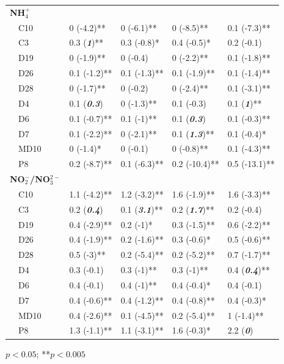 \documentclass[journal = esthag, manuscript = article]{achemso}\usepackage[]{graphicx}\usepackage[]{color}
\begin{document}
\begin{table}[!tbp]
\begin{center}
\begin{tabular}{lllll}
\hline
{\bfseries NH$_{4}^{+}$}&&&&\tabularnewline
~~C10&0 \footnotesize{(-4.2)**}&0 \footnotesize{(-6.1)**}&0 \footnotesize{(-8.5)**}&0.1 \footnotesize{(-7.3)**}\tabularnewline
~~C3&0.3 \footnotesize{(\textit{\textbf{1}})**}&0.3 \footnotesize{(-0.8)*}&0.4 \footnotesize{(-0.5)*}&0.2 \footnotesize{(-0.1)}\tabularnewline
~~D19&0 \footnotesize{(-1.9)**}&0 \footnotesize{(-0.4)}&0 \footnotesize{(-2.2)**}&0.1 \footnotesize{(-1.8)**}\tabularnewline
~~D26&0.1 \footnotesize{(-1.2)**}&0.1 \footnotesize{(-1.3)**}&0.1 \footnotesize{(-1.9)**}&0.1 \footnotesize{(-1.4)**}\tabularnewline
~~D28&0 \footnotesize{(-1.7)**}&0 \footnotesize{(-0.2)}&0 \footnotesize{(-2.4)**}&0.1 \footnotesize{(-3.1)**}\tabularnewline
~~D4&0.1 \footnotesize{(\textit{\textbf{0.3}})}&0 \footnotesize{(-1.3)**}&0.1 \footnotesize{(-0.3)}&0.1 \footnotesize{(\textit{\textbf{1}})**}\tabularnewline
~~D6&0.1 \footnotesize{(-0.7)**}&0.1 \footnotesize{(-1)**}&0.1 \footnotesize{(\textit{\textbf{0.3}})}&0.1 \footnotesize{(-0.3)**}\tabularnewline
~~D7&0.1 \footnotesize{(-2.2)**}&0 \footnotesize{(-2.1)**}&0.1 \footnotesize{(\textit{\textbf{1.3}})**}&0.1 \footnotesize{(-0.4)*}\tabularnewline
~~MD10&0 \footnotesize{(-1.4)*}&0 \footnotesize{(-0.1)}&0 \footnotesize{(-0.8)**}&0.1 \footnotesize{(-4.3)**}\tabularnewline
~~P8&0.2 \footnotesize{(-8.7)**}&0.1 \footnotesize{(-6.3)**}&0.2 \footnotesize{(-10.4)**}&0.5 \footnotesize{(-13.1)**}\tabularnewline
\hline
{\bfseries NO$_{2}^{-}$/NO$_{3}^{2-}$}&&&&\tabularnewline
~~C10&1.1 \footnotesize{(-4.2)**}&1.2 \footnotesize{(-3.2)**}&1.6 \footnotesize{(-1.9)**}&1.6 \footnotesize{(-3.3)**}\tabularnewline
~~C3&0.2 \footnotesize{(\textit{\textbf{0.4}})}&0.1 \footnotesize{(\textit{\textbf{3.1}})**}&0.2 \footnotesize{(\textit{\textbf{1.7}})**}&0.2 \footnotesize{(-0.4)}\tabularnewline
~~D19&0.4 \footnotesize{(-2.9)**}&0.2 \footnotesize{(-1)*}&0.3 \footnotesize{(-1.5)**}&0.6 \footnotesize{(-2.2)**}\tabularnewline
~~D26&0.4 \footnotesize{(-1.9)**}&0.2 \footnotesize{(-1.6)**}&0.3 \footnotesize{(-0.6)*}&0.5 \footnotesize{(-0.6)**}\tabularnewline
~~D28&0.5 \footnotesize{(-3)**}&0.2 \footnotesize{(-5.4)**}&0.2 \footnotesize{(-5.2)**}&0.7 \footnotesize{(-1.7)**}\tabularnewline
~~D4&0.3 \footnotesize{(-0.1)}&0.3 \footnotesize{(-1)**}&0.3 \footnotesize{(-1)**}&0.4 \footnotesize{(\textit{\textbf{0.4}})**}\tabularnewline
~~D6&0.4 \footnotesize{(-0.1)}&0.4 \footnotesize{(-1)**}&0.4 \footnotesize{(-0.4)*}&0.4 \footnotesize{(-0.1)}\tabularnewline
~~D7&0.4 \footnotesize{(-0.6)**}&0.4 \footnotesize{(-1.2)**}&0.4 \footnotesize{(-0.8)**}&0.4 \footnotesize{(-0.3)*}\tabularnewline
~~MD10&0.4 \footnotesize{(-2.6)**}&0.1 \footnotesize{(-4.5)**}&0.2 \footnotesize{(-5.4)**}&1 \footnotesize{(-1.4)**}\tabularnewline
~~P8&1.3 \footnotesize{(-1.1)**}&1.1 \footnotesize{(-3.1)**}&1.6 \footnotesize{(-0.3)*}&2.2 \footnotesize{(\textit{\textbf{0}})}\tabularnewline
\hline
\end{tabular}\end{center}

\footnotesize *$p<0.05$; **$p<0.005$\end{table}
\end{document}
